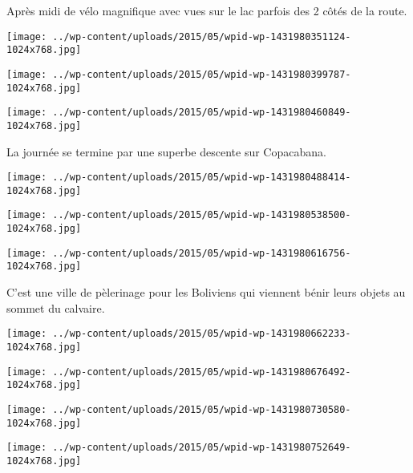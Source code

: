 Après midi de vélo magnifique avec vues sur le lac parfois des 2 côtés de la route. 
\begin{center} \texttt{[image: ../wp-content/uploads/2015/05/wpid-wp-1431980351124-1024x768.jpg]} \end{center}

\begin{center} \texttt{[image: ../wp-content/uploads/2015/05/wpid-wp-1431980399787-1024x768.jpg]} \end{center}
\begin{center} \texttt{[image: ../wp-content/uploads/2015/05/wpid-wp-1431980460849-1024x768.jpg]} \end{center}
\pagebreak

La journée se termine par une superbe descente sur Copacabana. 
\begin{center} \texttt{[image: ../wp-content/uploads/2015/05/wpid-wp-1431980488414-1024x768.jpg]} \end{center}
\begin{center} \texttt{[image: ../wp-content/uploads/2015/05/wpid-wp-1431980538500-1024x768.jpg]} \end{center}

\begin{center} \texttt{[image: ../wp-content/uploads/2015/05/wpid-wp-1431980616756-1024x768.jpg]} \end{center}

C'est une ville de pèlerinage pour les Boliviens qui viennent bénir leurs objets au sommet du calvaire. 
\begin{center} \texttt{[image: ../wp-content/uploads/2015/05/wpid-wp-1431980662233-1024x768.jpg]} \end{center}

\begin{center} \texttt{[image: ../wp-content/uploads/2015/05/wpid-wp-1431980676492-1024x768.jpg]} \end{center}
\begin{center} \texttt{[image: ../wp-content/uploads/2015/05/wpid-wp-1431980730580-1024x768.jpg]} \end{center}

\begin{center} \texttt{[image: ../wp-content/uploads/2015/05/wpid-wp-1431980752649-1024x768.jpg]} \end{center}

